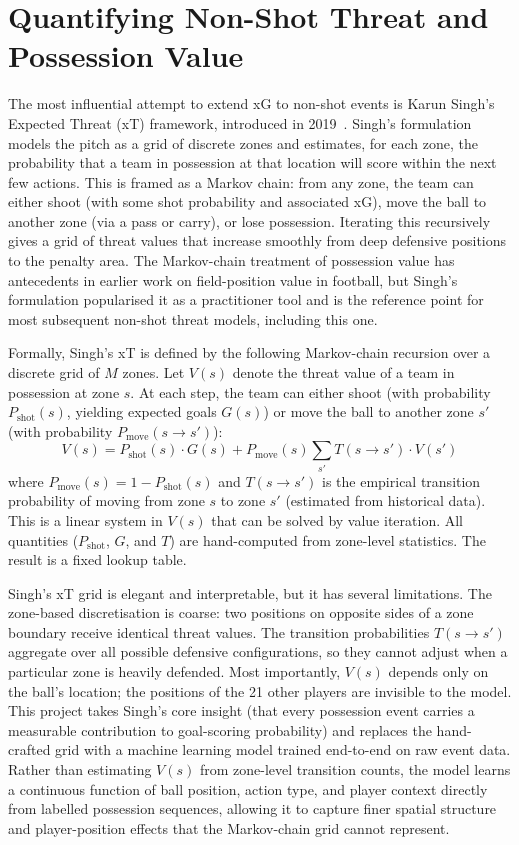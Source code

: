 \section{Quantifying Non-Shot Threat and Possession Value}\label{sec:bg_possession_value}

The most influential attempt to extend xG to non-shot events is Karun Singh's Expected Threat (xT) framework, introduced in 2019~\cite{singh2019}. Singh's formulation models the pitch as a grid of discrete zones and estimates, for each zone, the probability that a team in possession at that location will score within the next few actions. This is framed as a Markov chain: from any zone, the team can either shoot (with some shot probability and associated xG), move the ball to another zone (via a pass or carry), or lose possession. Iterating this recursively gives a grid of threat values that increase smoothly from deep defensive positions to the penalty area. The Markov-chain treatment of possession value has antecedents in earlier work on field-position value in football, but Singh's formulation popularised it as a practitioner tool and is the reference point for most subsequent non-shot threat models, including this one.

Formally, Singh's xT is defined by the following Markov-chain recursion over a discrete grid of $M$ zones. Let $V(s)$ denote the threat value of a team in possession at zone $s$. At each step, the team can either shoot (with probability $P_\text{shot}(s)$, yielding expected goals $G(s)$) or move the ball to another zone $s'$ (with probability $P_\text{move}(s \to s')$):
\[
    V(s) = P_\text{shot}(s)\cdot G(s) + P_\text{move}(s)\sum_{s'} T(s \to s')\cdot V(s')
\]
where $P_\text{move}(s) = 1 - P_\text{shot}(s)$ and $T(s \to s')$ is the empirical transition probability of moving from zone $s$ to zone $s'$ (estimated from historical data). This is a linear system in $V(s)$ that can be solved by value iteration. All quantities ($P_\text{shot}$, $G$, and $T$) are hand-computed from zone-level statistics. The result is a fixed lookup table.

Singh's xT grid is elegant and interpretable, but it has several limitations. The zone-based discretisation is coarse: two positions on opposite sides of a zone boundary receive identical threat values. The transition probabilities $T(s \to s')$ aggregate over all possible defensive configurations, so they cannot adjust when a particular zone is heavily defended. Most importantly, $V(s)$ depends only on the ball's location; the positions of the 21 other players are invisible to the model. This project takes Singh's core insight (that every possession event carries a measurable contribution to goal-scoring probability) and replaces the hand-crafted grid with a machine learning model trained end-to-end on raw event data. Rather than estimating $V(s)$ from zone-level transition counts, the model learns a continuous function of ball position, action type, and player context directly from labelled possession sequences, allowing it to capture finer spatial structure and player-position effects that the Markov-chain grid cannot represent.


